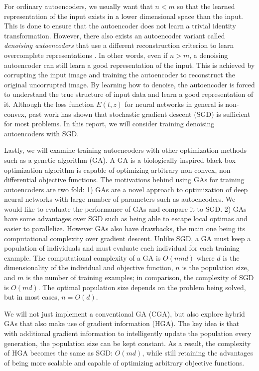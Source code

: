 For ordinary autoencoders, we usually want that $n<m$ so that the learned representation of the input exists in a lower dimensional space than the input. This is done to ensure that the autoencoder does not learn a trivial identity transformation. However, there also exists an autoencoder variant called \textit{denoising autoencoders} that use a different reconstruction criterion to learn overcomplete representations \cite{vincent2010stacked}. In other words, even if $n>m$, a denoising autoencoder can still learn a good representation of the input. This is achieved by corrupting the input image and training the autoencoder to reconstruct the original uncorrupted image. By learning how to denoise, the autoencoder is forced to understand the true structure of input data and learn a good representation of it. Although the loss function $E(t,z)$ for neural networks in general is non-convex, past work has shown that stochastic gradient descent (SGD) is sufficient for most problems. In this report, we will consider training denoising autoencoders with SGD. 

Lastly, we will examine training autoencoders with other optimization methods such as a genetic algorithm (GA). A GA is a biologically inspired black-box optimization algorithm is capable of optimizing arbitrary non-convex, non-differential objective functions. The motivations behind using GAs for training autoencoders are two fold: 1) GAs are a novel approach to optimization of deep neural networks with large number of parameters such as autoencoders. We would like to evaluate the performance of GAs and compare it to SGD. 2) GAs have some advantages over SGD such as being able to escape local optimas and easier to parallelize. However GAs also have drawbacks, the main one being its computational complexity over gradient descent. Unlike SGD, a GA must keep a population of individuals and must evaluate each individual for each training example. The computational complexity of a GA is $O(mnd)$ where $d$ is the dimensionality of the individual and objective function, $n$ is the population size, and $m$ is the number of training examples; in comparison, the complexity of SGD is $O(md)$. The optimal population size depends on the problem being solved, but in most cases, $n=O(d)$. 

We will not just implement a conventional GA (CGA), but also explore hybrid GAs that also make use of gradient information (HGA). The key idea is that with additional gradient information to intelligently update the population every generation, the population size can be kept constant. As a result, the complexity of HGA becomes the same as SGD: $O(md)$, while still retaining the advantages of being more scalable and capable of optimizing arbitrary objective functions.

